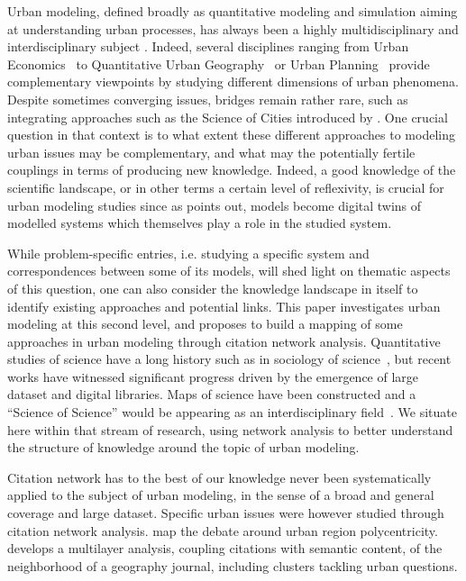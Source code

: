 Urban modeling, defined broadly as quantitative modeling and simulation aiming at understanding urban processes, has always been a highly multidisciplinary and interdisciplinary subject \cite{ramadier2004transdisciplinarity}. Indeed, several disciplines ranging from Urban Economics~\cite{krugman1998s} to Quantitative Urban Geography~\cite{pumain2017geography} or Urban Planning~\cite{knowles2016sir} provide complementary viewpoints by studying different dimensions of urban phenomena. Despite sometimes converging issues, bridges remain rather rare, such as integrating approaches such as the Science of Cities introduced by \cite{batty2013new}. One crucial question in that context is to what extent these different approaches to modeling urban issues may be complementary, and what may the potentially fertile couplings in terms of producing new knowledge. Indeed, a good knowledge of the scientific landscape, or in other terms a certain level of reflexivity, is crucial for urban modeling studies since as \cite{batty2019map} points out, models become digital twins of modelled systems which themselves play a role in the studied system.


While problem-specific entries, i.e. studying a specific system and correspondences between some of its models, will shed light on thematic aspects of this question, one can also consider the knowledge landscape in itself to identify existing approaches and potential links. This paper investigates urban modeling at this second level, and proposes to build a mapping of some approaches in urban modeling through citation network analysis. Quantitative studies of science have a long history such as in sociology of science~\cite{barnes1982science}, but recent works have witnessed significant progress driven by the emergence of large dataset and digital libraries. Maps of science have been constructed \cite{boyack2005mapping} and a ``Science of Science'' would be appearing as an interdisciplinary field~\cite{fortunato2018science}. We situate here within that stream of research, using network analysis to better understand the structure of knowledge around the topic of urban modeling.


Citation network has to the best of our knowledge never been systematically applied to the subject of urban modeling, in the sense of a broad and general coverage and large dataset. Specific urban issues were however studied through citation network analysis. \cite{van2016pacifying} map the debate around urban region polycentricity. \cite{raimbault2019exploration} develops a multilayer analysis, coupling citations with semantic content, of the neighborhood of a geography journal, including clusters tackling urban questions.

